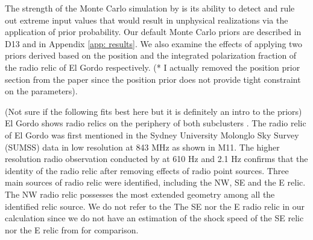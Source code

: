 The strength of the Monte Carlo simulation by  is its ability
to detect and rule out extreme input values that would result in
unphysical realizations via the application of prior probability. 
Our default Monte Carlo priors are described in D13 and in Appendix
\ref{app: results}. We also examine the effects of applying 
two priors derived based on the position and the integrated polarization
fraction of the radio relic of El Gordo respectively. (* I actually removed
the position prior section from the paper since the position prior does not
provide tight constraint on the parameters). \par 
(Not sure if the following fits best here but it is definitely an intro to
the priors) 
El Gordo shows radio relics on the periphery of both subclusters
. The
radio relic  of El Gordo was first mentioned in the Sydney University
Molonglo Sky Survey (SUMSS) data in low resolution at 843 MHz
\citep{Mauch03} as shown in M11. The higher resolution radio observation
conducted by \cite{L13} at 610 \mega Hz and 2.1 \giga Hz confirms that the identity of the radio relic
after removing effects of radio point sources. 
Three main sources of radio relic were identified, including the NW, SE and the
E relic. The NW radio relic possesses the most extended geometry among all
the identified relic source. We do not refer to the The SE nor the E radio
relic in our calculation since we do not have an estimation of the shock
speed of the SE relic nor the E relic from \citet{L13} for comparison.    


